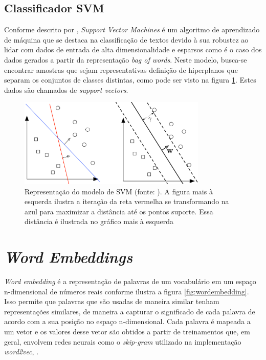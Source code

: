 \subsection{Classificador SVM}
\label{theoretical_SVM}
Conforme descrito por \cite{SVM4textClassification}, \textit{Support Vector Machines} é um algoritmo de aprendizado de máquina que se destaca na classificação de textos devido à sua robustez ao lidar com dados de entrada de alta dimensionalidade e esparsos como é o caso dos dados gerados a partir da representação \textit{bag of words}. Neste modelo, busca-se encontrar amostras que sejam representativas definição de hiperplanos que separam os conjuntos de classes distintas, como pode ser visto na figura \ref{fig:theorical_SVM}. Estes dados são chamados de \textit{support vectors}.

\begin{figure}[!ht]
	\centering
	\includegraphics[width=0.8\textwidth]{figures/theorical_SVM.png}
	\caption{Representação do modelo de SVM (fonte: \cite{SVM_Weinberger}). A figura mais à esquerda ilustra a iteração da reta vermelha se transformando na azul para maximizar a distância até os pontos suporte. Essa distância é ilustrada no gráfico mais à esquerda}
	\label{fig:theorical_SVM}
\end{figure}

\section{\textit{Word Embeddings}}

\textit{Word embedding} é a representação de palavras de um vocabulário em um espaço n-dimensional de números reais conforme ilustra a figura \ref{fig:wordembedding}. Isso permite que palavras que são usadas de maneira similar tenham representações similares, de maneira a capturar o significado de cada palavra de acordo com a sua posição no espaço n-dimensional. Cada palavra é mapeada a um vetor e os valores desse vetor são obtidos a partir de treinamentos que, em geral, envolvem redes neurais como o \textit{skip-gram} utilizado na implementação \textit{word2vec}, \cite{DBLP:journals/corr/MikolovSCCD13}.

